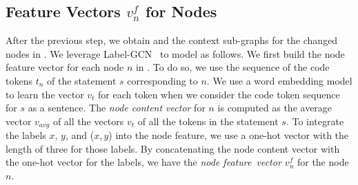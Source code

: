 
\subsection{Feature Vectors $v^{f}_n$ for {\mvpdgxy} Nodes}
\label{feature:sec}

After the previous step, we obtain {\mvpdgxy} and the context
sub-graphs for the changed nodes in {\mvpdgxy}. We leverage
Label-GCN~\cite{label-gcn} to model {\mvpdgxy} as follows. We first
build the node feature vector for each node $n$ in {\mvpdgxy}. To do
so, we use the sequence of the code tokens $t_n$ of the statement $s$
corresponding to $n$. We use a word embedding
model to learn the vector $v_t$ for each token when we consider the
code token sequence for $s$ as a sentence. The {\em node content
  vector} for $n$ is computed as the average vector $v_{avg}$ of
all the vectors $v_t$ of all the tokens in the statement $s$.
%
To integrate the labels $x$, $y$, and ($x,y$) into the node feature,
we use a one-hot vector with the length of three for those labels. By
concatenating the node content vector with the one-hot vector for the
labels, we have the {\em node feature~vector $v^{f}_n$} for the node
$n$. 



